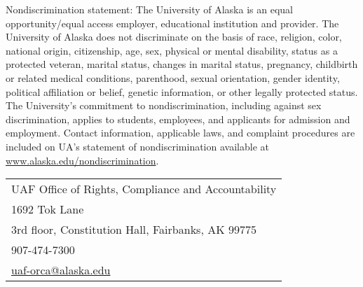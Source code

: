 \documentclass[11pt]{article}
\begin{document}
Nondiscrimination statement: The University of Alaska is an equal opportunity/equal access employer, educational institution and provider. The University of Alaska does not discriminate on the basis of race, religion, color, national origin, citizenship, age, sex, physical or mental disability, status as a protected veteran, marital status, changes in marital status, pregnancy, childbirth or related medical conditions, parenthood, sexual orientation, gender identity, political affiliation or belief, genetic information, or other legally protected status. The University's commitment to nondiscrimination, including against sex discrimination, applies to students, employees, and applicants for admission and employment. Contact information, applicable laws, and complaint procedures are included on UA's statement of nondiscrimination available at \url{www.alaska.edu/nondiscrimination}.

\begin{tabular}{l}
UAF Office of Rights, Compliance and Accountability\\
1692 Tok Lane\\
3rd floor, Constitution Hall, Fairbanks, AK 99775\\
907-474-7300\\
\url{uaf-orca@alaska.edu}
\end{tabular}
\end{document}
